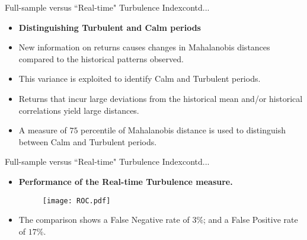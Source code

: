 \documentclass{beamer}
\begin{document}
\begin{frame}{Full-sample versus ``Real-time" Turbulence Index}{contd...}
	\vspace*{0 in}
	\begin{itemize}
		\item{\textbf{Distinguishing Turbulent and Calm periods}}\vspace{0in}
		\item {New information on returns causes changes in Mahalanobis distances compared to the 			historical patterns observed.}\newline
		\item {This variance is exploited to identify Calm and Turbulent periods.} \newline
		\item{Returns that incur large deviations from the historical mean and/or historical correlations yield large distances.}\newline
		\item {A measure of \alert{$75$ percentile} of Mahalanobis distance is used to distinguish between Calm and Turbulent periods.}
	\end{itemize}
\end{frame}

\begin{frame}{Full-sample versus ``Real-time" Turbulence Index}{contd...}
	\vspace*{-0.2 in}
	\begin{itemize}
		\vspace{-0 in}
		\item{\textbf{Performance of the Real-time Turbulence measure.}}
		\vspace{-0.9 in}
		\begin{figure}
			\scalebox{1}
			{\hspace*{-0.5 in}\texttt{[image: ROC.pdf]} }
		\end{figure}
	\vspace*{-9.2in}
		\item{The comparison shows a False Negative rate of $3$\%; and a False Positive rate of $17$\%.}
	\end{itemize}
\end{frame}
\end{document}
